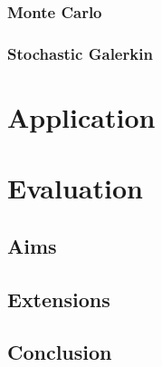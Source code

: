 \documentclass{article}
\numberwithin{equation}{section}
\begin{document}

\subsubsection{Monte Carlo}

\subsubsection{Stochastic Galerkin}

\newpage

\section{Application}

\newpage

\section{Evaluation}

\subsection{Aims}

\subsection{Extensions}

\subsection{Conclusion}

\newpage



\end{document}
